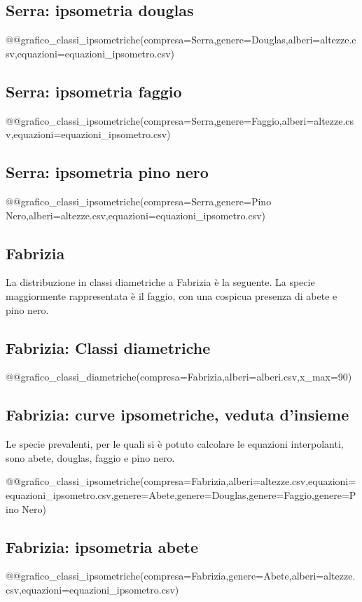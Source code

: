 \subsection*{Serra: ipsometria douglas}
@@grafico_classi_ipsometriche(compresa=Serra,genere=Douglas,alberi=altezze.csv,equazioni=equazioni_ipsometro.csv)

\subsection*{Serra: ipsometria faggio}
@@grafico_classi_ipsometriche(compresa=Serra,genere=Faggio,alberi=altezze.csv,equazioni=equazioni_ipsometro.csv)
\clearpage

\subsection*{Serra: ipsometria pino nero}
@@grafico_classi_ipsometriche(compresa=Serra,genere=Pino Nero,alberi=altezze.csv,equazioni=equazioni_ipsometro.csv)
\clearpage

\subsection{Fabrizia}

La distribuzione in classi diametriche a Fabrizia è la seguente. La specie maggiormente rappresentata è il faggio, con una cospicua presenza di abete e pino nero.

\subsection*{Fabrizia: Classi diametriche}
@@grafico_classi_diametriche(compresa=Fabrizia,alberi=alberi.csv,x_max=90)

\subsection*{Fabrizia: curve ipsometriche, veduta d'insieme}
Le specie prevalenti, per le quali si è potuto calcolare le equazioni interpolanti, sono abete, douglas, faggio e pino nero.

@@grafico_classi_ipsometriche(compresa=Fabrizia,alberi=altezze.csv,equazioni=equazioni_ipsometro.csv,genere=Abete,genere=Douglas,genere=Faggio,genere=Pino Nero)
\clearpage

\subsection*{Fabrizia: ipsometria abete}
@@grafico_classi_ipsometriche(compresa=Fabrizia,genere=Abete,alberi=altezze.csv,equazioni=equazioni_ipsometro.csv)

